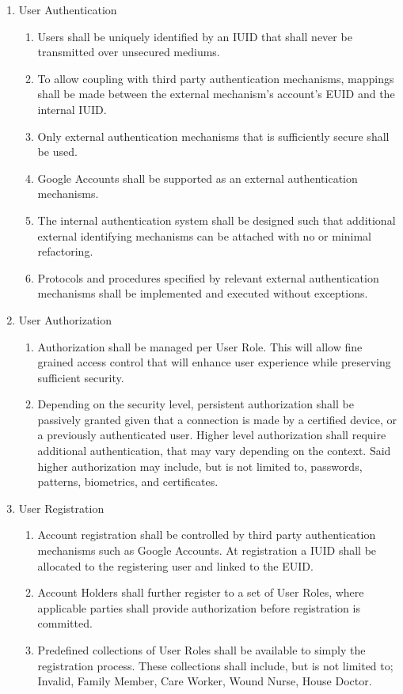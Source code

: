 \begin{enumerate}
	\item{User Authentication}
	\begin{enumerate}
		\item Users shall be uniquely identified by an IUID that shall never be transmitted over unsecured mediums.
		\item To allow coupling with third party authentication mechanisms, mappings shall be made between the external mechanism's account's EUID and the internal IUID.
		\item Only external authentication mechanisms that is sufficiently secure shall be used.
		\item Google Accounts shall be supported as an external authentication mechanisms.
		\item The internal authentication system shall be designed such that additional external identifying mechanisms can be attached with no or minimal refactoring.
		\item Protocols and procedures specified by relevant external authentication mechanisms shall be implemented and executed without exceptions.
	\end{enumerate}
	\item{User Authorization}
	\begin{enumerate}
		\item Authorization shall be managed per User Role. This will allow fine grained access control that will enhance user experience while preserving sufficient security.
		\item Depending on the security level, persistent authorization shall be passively granted given that a connection is made by a certified device, or a previously authenticated user. Higher level authorization shall require additional authentication, that may vary depending on the context. Said higher authorization may include, but is not limited to, passwords, patterns, biometrics, and certificates.
	\end{enumerate}
	\item{User Registration}
	\begin{enumerate}
		\item Account registration shall be controlled by third party authentication mechanisms such as Google Accounts. At registration a IUID shall be allocated to the registering user and linked to the EUID. 
		\item Account Holders shall further register to a set of User Roles, where applicable parties shall provide authorization before registration is committed.
		\item Predefined collections of User Roles shall be available to simply the registration process. These collections shall include, but is not limited to; Invalid, Family Member, Care Worker, Wound Nurse, House Doctor.
		

\end{enumerate}
\end{enumerate}
